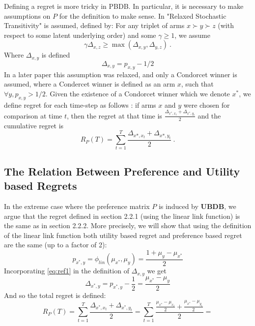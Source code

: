 \documentclass[MSc,beforeExam]{iitcsthesis}
\begin{document}
		 		 Defining a regret is more tricky in PBDB. In particular, it is necessary to make assumptions on $P$ for the definition to make sense.
		 In \cite{yue2011beat} "Relaxed Stochastic Transitivity" is assumed, defined by:
		 For any triplet of arms $x \succ y \succ z$ (with respect to some latent underlying order) and some $ \gamma \geq 1 $,
		 we assume $$\gamma \Delta_{x,z} \geq \max(\Delta_{x,y},\Delta_{y,z})\ .$$
		 Where $\Delta_{x,y}$ is defined
		 \begin{equation}\label{eq:delta}
		 	\Delta_{x,y} = p_{x,y} - 1/2
		 \end{equation}
		 In a later paper \cite{urvoy2013generic} this assumption was relaxed, and only a Condorcet winner is assumed, where a Condercet winner is defined as an arm $x$, such that $ \forall y, p_{x,y} > 1/2$. 
		 Given the existence of a Condorcet winner which we denote $x^*$, we define regret for each time-step as follows \cite{yue2011beat}: if arms $x$ and $y$ were chosen for comparison at time $t$, then the  regret at that time is $ \frac{\Delta_{x^*,x_t}+\Delta_{x^*,y_t}}{2} $ and the cumulative regret is
		 \begin{equation}\label{eq:preference_regret}
		 R_P(T) = \sum_{t=1}^T \frac{\Delta_{x*,x_t}+\Delta_{x*,y_t}}{2}\ .
		 \end{equation}

		 \subsection{The Relation Between Preference and Utility based Regrets}
	
	In the extreme case where the preference matrix $P$ is induced by \textbf{UBDB}, we argue that the regret defined in section 2.2.1 (using the linear link function) is the same as in section 2.2.2.
More precisely, we will show that using the definition of the linear link function both utility based regret and preference based regret are the same (up to a factor of 2):
	\begin{equation}\label{eq:ref1}
		p_{x^*,y} = \phi_{lin}(\mu_{x^*},\mu_{y}) = \frac{1 +\mu_{y}-\mu_{x^*}}{2}
	\end{equation}
	Incorporating \eqref{eq:ref1} in the definition of $\Delta_{x,y}$ we get
	$$
	\Delta_{x^*,y} = p_{x^*,y} - \frac{1}{2} = \frac{\mu_{x^*}-\mu_{y}}{2}
	$$
	And so the total regret is defined:
	\
	$$ R_P(T) = \sum_{t=1}^T \frac{\Delta_{x^*,x_t}+\Delta_{x^*,y_t}}{2} = 
\sum_{t=1}^T \frac{\frac{\mu_{x^*}-\mu_{x_t}}{2}+\frac{\mu_{x^*}-\mu_{y_t}}{2}}{2} =
$$
\end{document}
